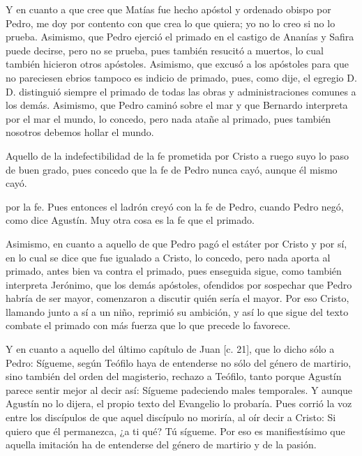 Y en cuanto a que cree que Matías fue hecho apóstol y ordenado obispo por Pedro, me doy por contento con que crea lo que quiera; yo no lo creo si no lo prueba. Asimismo, que Pedro ejerció el primado en el castigo de Ananías y Safira puede decirse, pero no se prueba, pues también resucitó a muertos, lo cual también hicieron otros apóstoles. Asimismo, que excusó a los apóstoles para que no pareciesen ebrios tampoco es indicio de primado, pues, como dije, el egregio D. D. distinguió siempre el primado de todas las obras y administraciones comunes a los demás. Asimismo, que Pedro caminó sobre el mar y que Bernardo interpreta por el mar el mundo, lo concedo, pero nada atañe al primado, pues también nosotros debemos hollar el mundo.

Aquello de la indefectibilidad de la fe prometida por Cristo a ruego suyo lo paso de buen grado, pues concedo que la fe de Pedro nunca cayó, aunque él mismo cayó.

por la fe. Pues entonces el ladrón creyó con la fe de Pedro, cuando Pedro negó, como dice Agustín. Muy otra cosa es la fe que el primado.

Asimismo, en cuanto a aquello de que Pedro pagó el estáter por Cristo y por sí, en lo cual se dice que fue igualado a Cristo, lo concedo, pero nada aporta al primado, antes bien va contra el primado, pues enseguida sigue, como también interpreta Jerónimo, que los demás apóstoles, ofendidos por sospechar que Pedro habría de ser mayor, comenzaron a discutir quién sería el mayor. Por eso Cristo, llamando junto a sí a un niño, reprimió su ambición, y así lo que sigue del texto combate el primado con más fuerza que lo que precede lo favorece.

Y en cuanto a aquello del último capítulo de Juan [c. 21], que lo dicho sólo a Pedro: Sígueme, según Teófilo haya de entenderse no sólo del género de martirio, sino también del orden del magisterio, rechazo a Teófilo, tanto porque Agustín parece sentir mejor al decir así: Sígueme padeciendo males temporales. Y aunque Agustín no lo dijera, el propio texto del Evangelio lo probaría. Pues corrió la voz entre los discípulos de que aquel discípulo no moriría, al oír decir a Cristo: Si quiero que él permanezca, ¿a ti qué? Tú sígueme. Por eso es manifiestísimo que aquella imitación ha de entenderse del género de martirio y de la pasión.


